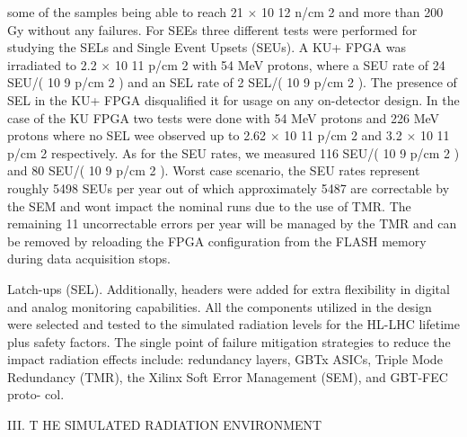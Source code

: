 \documentclass{article}
\begin{document}
some of the samples being able to reach 21  $\times$  10 12   n/cm 2   and 
more   than   200   Gy   without   any   failures. 
For   SEEs   three   different   tests   were   performed   for   studying 
the   SELs   and   Single   Event   Upsets   (SEUs).   A   KU+   FPGA 
was   irradiated   to   2.2   $\times$   10 11   p/cm 2   with   54   MeV   protons, 
where   a   SEU   rate   of   24   SEU/( 10 9   p/cm 2 )   and   an   SEL   rate   of 
2   SEL/( 10 9   p/cm 2 ).   The   presence   of   SEL   in   the   KU+   FPGA 
disqualified it for usage on any on-detector design. In the case 
of   the   KU   FPGA   two   tests   were   done   with   54   MeV   protons 
and   226   MeV   protons   where   no   SEL   wee   observed   up   to 
2.62   $\times$   10 11   p/cm 2   and   3.2   $\times$   10 11   p/cm 2   respectively.   As 
for   the   SEU   rates,   we   measured   116   SEU/( 10 9   p/cm 2 )   and   80 
SEU/( 10 9   p/cm 2 ). Worst case scenario, the SEU rates represent 
roughly 5498 SEUs per year out of which approximately 5487 
are correctable by the SEM and wont impact the nominal runs 
due to the use of TMR. The remaining 11 uncorrectable errors 
per year will be managed by the TMR and can be removed by 
reloading   the   FPGA   configuration   from   the   FLASH   memory 
during   data   acquisition   stops.

Latch-ups   (SEL).   Additionally,   headers   were   added   for   extra 
flexibility in digital and analog monitoring capabilities. All the 
components   utilized   in   the   design   were   selected   and   tested   to 
the   simulated   radiation   levels   for   the   HL-LHC   lifetime   plus 
safety   factors.   The   single   point   of   failure   mitigation   strategies 
to   reduce   the   impact   radiation   effects   include:   redundancy 
layers,   GBTx   ASICs,   Triple   Mode   Redundancy   (TMR),   the 
Xilinx   Soft   Error   Management   (SEM),   and   GBT-FEC   proto- 
col.

III.   T HE   SIMULATED   RADIATION   ENVIRONMENT
\end{document}
